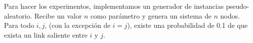 Para hacer los experimentos, implementamos un generador de instancias pseudo-aleatorio. Recibe un valor $n$ como parámetro y genera
un sistema de $n$ nodos. Para todo $i,j$, (con la excepción de $i=j$), existe una probabilidad de 0.1 de que exista un link saliente
entre $i$ y $j$.



